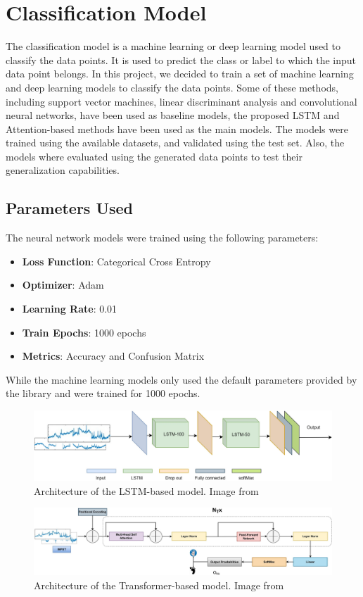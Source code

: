 \section{Classification Model}
The classification model is a machine learning or deep learning model used to classify the data points.
It is used to predict the class or label to which the input data point belongs.
In this project, we decided to train a set of machine learning and deep learning models to classify the data points.
Some of these methods, including support vector machines, linear discriminant analysis and convolutional neural networks, have been used as baseline models, the proposed LSTM and Attention-based methods have been used as the main models.
The models were trained using the available datasets, and validated using the test set.
Also, the models where evaluated using the generated data points to test their generalization capabilities.
\subsection*{Parameters Used}
The neural network models were trained using the following parameters:
\begin{itemize}
    \item \textbf{Loss Function}: Categorical Cross Entropy
    \item \textbf{Optimizer}: Adam
    \item \textbf{Learning Rate}: 0.01
    \item \textbf{Train Epochs}: 1000 epochs
    \item \textbf{Metrics}: Accuracy and Confusion Matrix
\end{itemize}
While the machine learning models only used the default parameters provided by the library and were trained for 1000 epochs.
\begin{figure}[!htbp]
    \centering
        \centering    
        \includegraphics[width=\textwidth]{Figures/Methodology/LSTM}
        \caption{Architecture of the LSTM-based model. Image from~\cite{sharma_deep_2023}}\label{fig:lstm_model}
\end{figure}
\begin{figure}[!htbp]
        \centering
        \includegraphics[width=\textwidth]{Figures/Methodology/Attention}
        \caption{Architecture of the Transformer-based model. Image from~\cite{sharma_deep_2023}}\label{fig:attention_model}
\end{figure}

